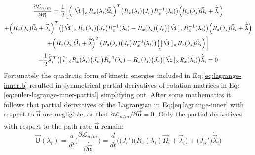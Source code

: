 \begin{multline}\label{eq:euler-lagrange-inner-partial}
\frac{\partial\mathcal{L}_{n/m}}{\partial\vec{\mathbf{u}}}=\frac{1}{2}\bigg[\Big([\hspace{2pt}\hat{\i}\hspace{2pt}]_\times R_x(\lambda_i)\vec{\Omega}_i\Big)^T\big(R_x(\lambda_i)\big(J_{r}\big)R_x^{-1}(\lambda_i)\big)\Big(R_x(\lambda_i)\vec{\Omega}_i+\dot{\vec{\lambda}}_i\Big)
\\
+\Big(R_x(\lambda_i)\vec{\Omega}_i+\dot{\vec{\lambda}}_i\Big)^T\big([\hspace{2pt}\hat{\i}\hspace{2pt}]_\times R_x(\lambda_i)\big(J_r\big)R_x^{-1}(\lambda_i)-R_x(\lambda_i)\big(J_r\big)[\hspace{2pt}\hat{\i}\hspace{2pt}]_\times R_x^{-1}(\lambda_i)\big)\Big(R_x(\lambda_i)\vec{\Omega}_i+\dot{\vec{\lambda}}\Big)
\\
+\Big(R_x(\lambda_i)\vec{\Omega}_i+\dot{\vec{\lambda}}\Big)^T\big(R_x(\lambda_i)\big(J_r\big)R_x^{-1}(\lambda_i)\big)\Big([\hspace{2pt}\hat{\i}\hspace{2pt}]_\times R_x(\lambda_i)\vec{\Omega}_i\Big)\bigg]
\\
+\frac{1}{2}\dot{\vec{\lambda}}_i^{\hspace{2pt}T}\big([\hspace{2pt}\hat{i}\hspace{2pt}]_\times R_x(\lambda_i)\big(J_{ir}\big)R_x^{-1}(\lambda_i)-R_x(\lambda_i)\big(J_r\big)[\hspace{2pt}\hat{\i}\hspace{2pt}]_\times R_x(\lambda_i)\big)\dot{\vec{\lambda}}_i=0
\end{multline}
Fortunately the quadratic form of kinetic energies included in Eq:\ref{eq:lagrange-inner.b} resulted in symmetrical partial derivatives of rotation matrices in Eq:\ref{eq:euler-lagrange-inner-partial} simplifying out. After some mathematics it follows that partial derivatives of the Lagrangian in Eq:\ref{eq:lagrange-inner} with respect to $\vec{\mathbf{u}}$ are negligible, or that $\partial\mathcal{L}_{n/m}/\partial\vec{\mathbf{u}}= 0$. Only the partial derivatives with respect to the path rate $\dot{\vec{\mathbf{u}}}$ remain:
\begin{equation}\label{eq:3.42b}
\vec{\mathbf{U}}(\lambda_i)=\frac{d}{dt}\bigg(\frac{\partial \mathcal{L}_{n/m}}{\partial \dot{\vec{\mathbf{u}}}}\bigg)=\frac{d}{dt}\bigg(\big(J_{r}'\big)\Big(R_x(\lambda_i)\vec{\Omega}_i+\dot{\vec{\lambda}}_i\Big)+\big(J_{ir}'\big)\dot{\vec{\lambda}}_i\bigg)
\end{equation}
